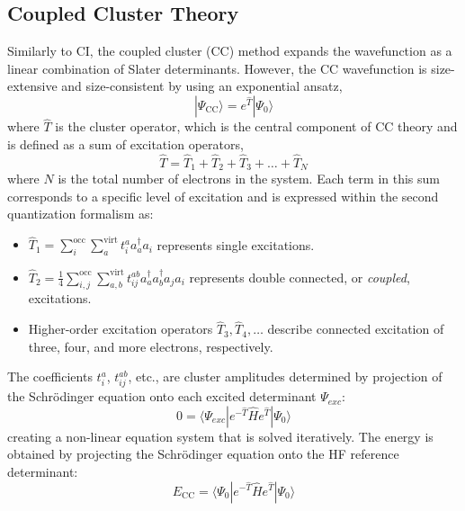 \subsection{Coupled Cluster Theory} \label{sec:CCTheory}
Similarly to CI, the coupled cluster (CC)\cite{shavitt2009many,vcivzek1966correlation,vcivzek1969use,monkhorst1977calculation,raghavachari1989fifth} method expands the wavefunction as a linear combination of Slater determinants. However, the CC wavefunction is size-extensive and size-consistent by using an exponential ansatz,
\begin{equation}\label{eq:CCWavenfunc}
    | \Psi_{\mathrm{CC}} \rangle = e^{\hat{T}} | \Psi_{0} \rangle
\end{equation}
where $\hat{T}$ is the cluster operator, which is the central component of CC theory and is defined as a sum of excitation operators,
\begin{equation}
    \hat{T} = \hat{T}_1 + \hat{T}_2 + \hat{T}_3 + \dots + \hat{T}_N
\end{equation}
where $N$ is the total number of electrons in the system. Each term in this sum corresponds to a specific level of excitation and is expressed within the second quantization formalism as:
\begin{itemize}
    \item $\hat{T}_1 = \sum_{i}^{\text{occ}} \sum_{a}^{\text{virt}} t_i^a a_a^{\dagger} a_i$ represents single excitations.
    \item $\hat{T}_2 = \frac{1}{4} \sum_{i,j}^{\text{occ}} \sum_{a,b}^{\text{virt}} t_{ij}^{ab} a_a^{\dagger} a_b^{\dagger} a_j a_i$ represents double connected, or \textit{coupled}, excitations.
    \item Higher-order excitation operators $\hat{T}_3, \hat{T}_4, \dots$ describe connected excitation of three, four, and more electrons, respectively.
\end{itemize}
The coefficients $t_i^a$, $t_{ij}^{ab}$, etc., are cluster amplitudes determined by projection of the Schr\"{o}dinger equation onto each excited determinant $\Psi_{exc}$:
\begin{equation}
    0 = \langle \Psi_{exc} | e^{-\hat{T}} \hat{H} e^{\hat{T}} | \Psi_{0} \rangle
\end{equation}
creating a non-linear equation system that is solved iteratively. The energy is obtained by projecting the Schr{\"o}dinger equation onto the HF reference determinant:
\begin{equation}\label{eq:CCEnergy}
    E_{\mathrm{CC}}=\langle \Psi_{0} | e^{-\hat{T}} \hat{H} e^{\hat{T}} | \Psi_{0} \rangle
\end{equation}

